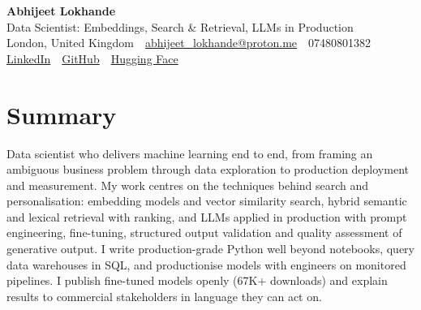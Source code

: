 \documentclass[10pt,a4paper]{article}
\newcommand{\sep}{\,\textcolor{accent!60}{\textbar}\,}
\begin{document}
\begin{center}
  {\fontsize{24}{26}\selectfont\bfseries Abhijeet Lokhande}\\[3pt]
  {\color{accent}\large Data Scientist: Embeddings, Search \& Retrieval, LLMs in Production}\\[5pt]
  {\small
    London, United Kingdom \sep
    \href{mailto:abhijeet_lokhande@proton.me}{abhijeet\_lokhande@proton.me} \sep
    07480801382 \\[2pt]
    \href{https://www.linkedin.com/in/ablds/}{LinkedIn} \sep
    \href{https://github.com/abhijeetscode}{GitHub} \sep
    \href{https://huggingface.co/ab-ai}{Hugging Face}
  }
\end{center}
\vspace{2pt}

\section{Summary}
Data scientist who delivers machine learning end to end, from framing an ambiguous business problem through data exploration to production deployment and measurement. My work centres on the techniques behind search and personalisation: embedding models and vector similarity search, hybrid semantic and lexical retrieval with ranking, and LLMs applied in production with prompt engineering, fine-tuning, structured output validation and quality assessment of generative output. I write production-grade Python well beyond notebooks, query data warehouses in SQL, and productionise models with engineers on monitored pipelines. I publish fine-tuned models openly (67K+ downloads) and explain results to commercial stakeholders in language they can act on.

\end{document}
